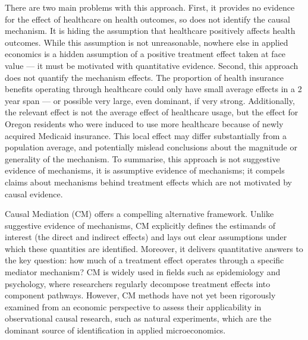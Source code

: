 There are two main problems with this approach.
First, it provides no evidence for the effect of healthcare on health outcomes, so does not identify the causal mechanism.
It is hiding the assumption that healthcare positively affects health outcomes.
While this assumption is not unreasonable, nowhere else in applied economics is a hidden assumption of a positive treatment effect taken at face value --- it must be motivated with quantitative evidence.
Second, this approach does not quantify the mechanism effects.
The proportion of health insurance benefits operating through healthcare could only have small average effects in a 2 year span --- or possible very large, even dominant, if very strong.
Additionally, the relevant effect is not the average effect of healthcare usage, but the effect for Oregon residents who were induced to use more healthcare because of newly acquired Medicaid insurance. 
This local effect may differ substantially from a population average, and potentially mislead conclusions about the magnitude or generality of the mechanism.
To summarise, this approach is not suggestive evidence of mechanisms, it is assumptive evidence of mechanisms; it compels claims about mechanisms behind treatment effects which are not motivated by causal evidence.


Causal Mediation (CM) offers a compelling alternative framework.
Unlike suggestive evidence of mechanisms, CM explicitly defines the estimands of interest (the direct and indirect effects) and lays out clear assumptions under which these quantities are identified.
Moreover, it delivers quantitative answers to the key question: how much of a treatment effect operates through a specific mediator mechanism?
CM is widely used in fields such as epidemiology and psychology, where researchers regularly decompose treatment effects into component pathways.
However, CM methods have not yet been rigorously examined from an economic perspective to assess their applicability in observational causal research, such as natural experiments, which are the dominant source of identification in applied microeconomics.
